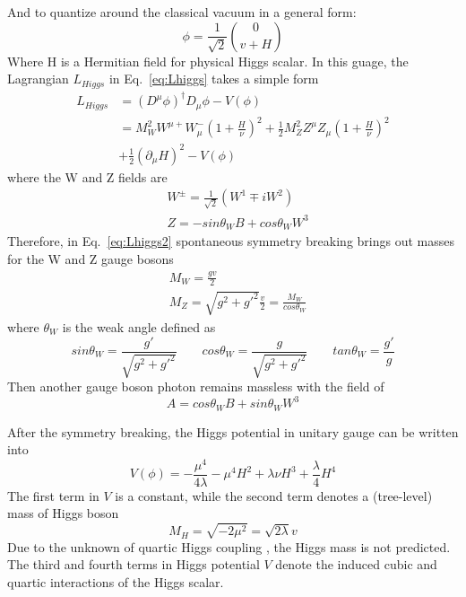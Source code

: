 And to quantize around the classical vacuum in a general form:
\begin{equation}
	\phi = \frac{1}{\sqrt{2}} \binom{0}{v+H}
\end{equation}
Where H is a Hermitian field for physical Higgs scalar.
In this guage, the Lagrangian $L_{Higgs}$ in Eq.~\ref{eq:Lhiggs} takes a simple form
\begin{equation}
\begin{split} \label{eq:Lhiggs2}
	L_{Higgs} & = \left(D^{\mu}\phi\right)^{\dagger}D_{\mu}\phi - V(\phi) \\
	& = M_{W}^{2}W^{\mu+}W_{\mu}^{-}\left(1+\frac{H}{\nu}\right)^{2} + \frac{1}{2}M_{Z}^{2}Z^{\mu}Z_{\mu}\left(1+\frac{H}{\nu}\right)^{2} \\ 
        &   + \frac{1}{2}\left(\partial_{\mu}H\right)^{2} - V(\phi)
\end{split}
\end{equation}
where the W and Z fields are
\begin{equation}
\begin{split}
	& W^{\pm} = \frac{1}{\sqrt{2}} \left(W^{1} \mp iW^{2}\right) \\
	& Z = - sin\theta_{W}B + cos\theta_{W}W^{3}
\end{split}
\end{equation}
Therefore, in Eq.~\ref{eq:Lhiggs2} spontaneous symmetry breaking brings out masses for the W and Z gauge bosons
\begin{equation}
\begin{split}
	& M_{W} = \frac{gv}{2} \\
	& M_{Z} = \sqrt{g^{2} + g'^{2}} \frac{v}{2} = \frac{M_{W}}{cos\theta_{W}}
\end{split}
\end{equation}
where $\theta_{W}$ is the weak angle defined as
\begin{equation}
	sin\theta_{W} = \frac{g'}{\sqrt{g^{2} + g'^{2}}} \qquad cos\theta_{W} = \frac{g}{\sqrt{g^{2} + g'^{2}}} \qquad tan\theta_{W} = \frac{g'}{g}
\end{equation}
Then another gauge boson photon remains massless with the field of
\begin{equation}
	A = cos\theta_{W}B + sin\theta_{W}W^{3}
\end{equation}

After the symmetry breaking, the Higgs potential in unitary gauge can be written into
\begin{equation}
	V(\phi) = -\frac{\mu^{4}}{4\lambda} - \mu^{4}H^{2} + \lambda\nu H^{3} + \frac{\lambda}{4}H^{4}
\end{equation}
The first term in $V$ is a constant, while the second term denotes a (tree-level) mass of Higgs boson
\begin{equation}
	M_{H} = \sqrt{-2\mu^{2}} = \sqrt{2\lambda}v
\end{equation}
Due to the unknown of  quartic Higgs coupling \lambda, the Higgs mass is not predicted.
The third and fourth terms in Higgs potential $V$ denote the induced cubic and quartic interactions of the Higgs scalar.

